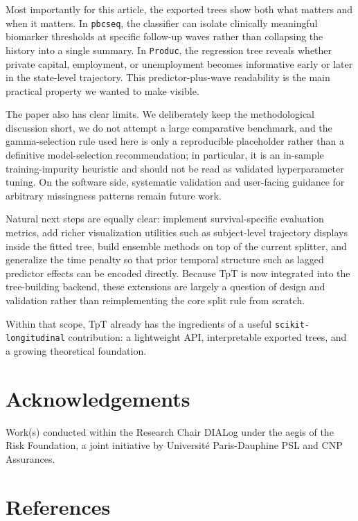 \documentclass[
]{article}
\begin{document}
Most importantly for this article, the exported trees show both what
matters and when it matters. In \texttt{pbcseq}, the classifier can
isolate clinically meaningful biomarker thresholds at specific follow-up
waves rather than collapsing the history into a single summary. In
\texttt{Produc}, the regression tree reveals whether private capital,
employment, or unemployment becomes informative early or later in the
state-level trajectory. This predictor-plus-wave readability is the main
practical property we wanted to make visible.

The paper also has clear limits. We deliberately keep the methodological
discussion short, we do not attempt a large comparative benchmark, and
the gamma-selection rule used here is only a reproducible placeholder
rather than a definitive model-selection recommendation; in particular,
it is an in-sample training-impurity heuristic and should not be read as
validated hyperparameter tuning. On the software side, systematic
validation and user-facing guidance for arbitrary missingness patterns
remain future work.

Natural next steps are equally clear: implement survival-specific
evaluation metrics, add richer visualization utilities such as
subject-level trajectory displays inside the fitted tree, build ensemble
methods on top of the current splitter, and generalize the time penalty
so that prior temporal structure such as lagged predictor effects can be
encoded directly. Because TpT is now integrated into the tree-building
backend, these extensions are largely a question of design and
validation rather than reimplementing the core split rule from scratch.

Within that scope, TpT already has the ingredients of a useful
\texttt{scikit-longitudinal} contribution: a lightweight API,
interpretable exported trees, and a growing theoretical foundation.

\section{Acknowledgements}\label{acknowledgements}

Work(s) conducted within the Research Chair DIALog under the aegis of
the Risk Foundation, a joint initiative by Université Paris-Dauphine PSL
and CNP Assurances.

\section*{References}\label{references}
\end{document}
